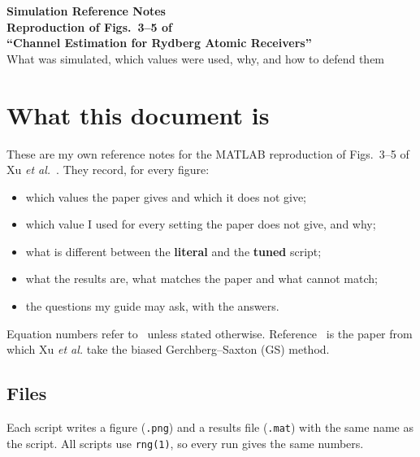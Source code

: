 \documentclass[11pt,a4paper]{article}
\newcommand{\file}[1]{\texttt{#1}}
\begin{document}
\begin{center}
{\Large\bfseries Simulation Reference Notes\\[2pt]
Reproduction of Figs.~3--5 of\\[2pt]
``Channel Estimation for Rydberg Atomic Receivers''}\\[6pt]
{\normalsize What was simulated, which values were used, why, and how to defend them}
\end{center}

\vspace{0.5em}

\section{What this document is}

These are my own reference notes for the MATLAB reproduction of Figs.~3--5 of
Xu \emph{et al.}~\cite{xu2025}. They record, for every figure:
\begin{itemize}[leftmargin=*,itemsep=1pt]
  \item which values the paper gives and which it does not give;
  \item which value I used for every setting the paper does not give, and why;
  \item what is different between the \textbf{literal} and the \textbf{tuned} script;
  \item what the results are, what matches the paper and what cannot match;
  \item the questions my guide may ask, with the answers.
\end{itemize}
Equation numbers refer to~\cite{xu2025} unless stated otherwise. Reference~\cite{cui2024} is the
paper from which Xu \emph{et al.} take the biased Gerchberg--Saxton (GS) method.

\subsection{Files}

Each script writes a figure (\file{.png}) and a results file (\file{.mat}) with the same name as
the script. All scripts use \file{rng(1)}, so every run gives the same numbers.
\end{document}
